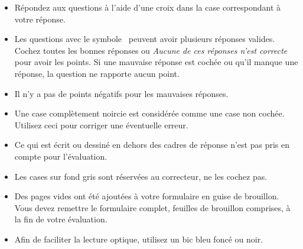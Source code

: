 \documentclass[11pt,french,a4paper]{article}
\begin{document}
{  \noindent\hrulefill{}
  \begin{itemize}[nosep]
    \item Répondez aux questions à l'aide d'une croix dans la case correspondant à votre réponse.
    \item Les questions avec le symbole~\multiSymbole{} peuvent avoir plusieurs réponses valides.
          Cochez toutes les bonnes réponses ou \textit{Aucune de ces réponses n'est correcte} pour avoir les points.
          Si une mauvaise réponse est cochée ou qu'il manque une réponse, la question ne rapporte aucun point.
    \item Il n'y a pas de points négatifs pour les mauvaises réponses.
    \item Une case complètement noircie est considérée comme une case non cochée.
          Utilisez ceci pour corriger une éventuelle erreur.
    \item Ce qui est écrit ou dessiné en dehors des cadres de réponse n'est pas pris en compte pour l'évaluation.
    \item Les cases sur fond gris sont réservées au correcteur, ne les cochez pas.
    \item Des pages vides ont été ajoutées à votre formulaire en guise de brouillon.
          Vous devez remettre le formulaire complet, feuilles de brouillon comprises, à la fin de votre évaluation.
    \item Afin de faciliter la lecture optique, utilisez un bic bleu foncé ou noir.
  \end{itemize}
  \noindent\hrulefill{}
  \vspace*{1.5em}





}
\end{document}
